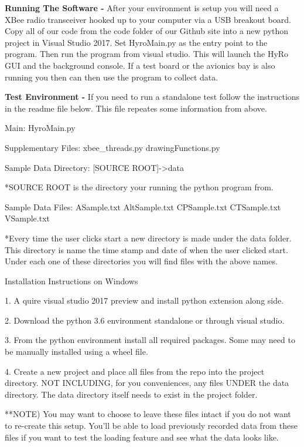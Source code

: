 \documentclass[10pt,draftclsnofoot,onecolumn,retainorgcmds]{IEEEtran}
\begin{document}
{\bf Running The Software - } After your environment is setup you will need a XBee radio transceiver hooked up to your computer via a USB breakout board. Copy all of our code from the code folder of our Github site into a new python project in Visual Studio 2017. Set HyroMain.py as the entry point to the program. Then run the program from visual studio. This will launch the HyRo GUI and the background console. If a test board or the avionics bay is also running you then can then use the program to collect data. \par

{\bf Test Environment - } If you need to run a standalone test follow the instructions in the readme file below.  This file repeates some information from above.\par

Main:
HyroMain.py

Supplementary Files:
xbee\_threads.py
drawingFunctions.py

Sample Data Directory:
[SOURCE ROOT]->data

*SOURCE ROOT is the directory your running the python program from.

Sample Data Files:
ASample.txt
AltSample.txt
CPSample.txt
CTSample.txt
VSample.txt

*Every time the user clicks start a new directory is made under the data folder. This directory is name the time stamp and date of when the user clicked start. 
Under each one of these directories you will find files with the above names.


Installation Instructions on Windows

1. A quire visual studio 2017 preview and install python extension along side.

2. Download the python 3.6 environment standalone or through visual studio.

3. From the python environment install all required packages. Some may need to be manually installed using a wheel file.

4. Create a new project and place all files from the repo into the project directory. NOT INCLUDING, for you conveniences, any files UNDER the 
data directory. The data directory itself needs to exist in the project folder.

**NOTE) You may want to choose to leave these files intact if you do not want to re-create this setup. You'll be able to load previously recorded data from these files
if you want to test the loading feature and see what the data looks like.
\end{document}
